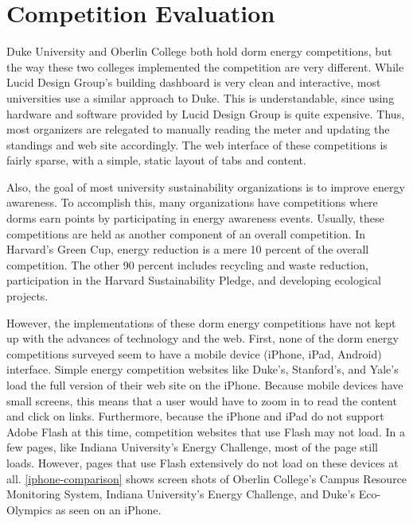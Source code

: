 \section{Competition Evaluation}
\label{competition-evaluation}

Duke University and Oberlin College both hold dorm energy competitions, but the way these two colleges implemented the competition are very different.  While Lucid Design Group's building dashboard is very clean and interactive, most universities use a similar approach to Duke.  This is understandable, since using hardware and software provided by Lucid Design Group is quite expensive.  Thus, most organizers are relegated to manually reading the meter and updating the standings and web site accordingly.  The web interface of these competitions is fairly sparse, with a simple, static layout of tabs and content.

Also, the goal of most university sustainability organizations is to improve energy awareness.  To accomplish this, many organizations have competitions where dorms earn points by participating in energy awareness events.  Usually, these competitions are held as another component of an overall competition. In Harvard's Green Cup\cite{harvard-greencup}, energy reduction is a mere 10 percent of the overall competition. The other 90 percent includes recycling and waste reduction, participation in the Harvard Sustainability Pledge, and developing ecological projects.

However, the implementations of these dorm energy competitions have not kept up with the advances of technology and the web.  First, none of the dorm energy competitions surveyed seem to have a mobile device (iPhone, iPad, Android) interface.  Simple energy competition websites like Duke's, Stanford's, and Yale's load the full version of their web site on the iPhone.  Because mobile devices have small screens, this means that a user would have to zoom in to read the content and click on links.  Furthermore, because the iPhone and iPad do not support Adobe Flash at this time, competition websites that use Flash may not load.  In a few pages, like Indiana University's Energy Challenge, most of the page still loads.  However, pages that use Flash extensively do not load on these devices at all.  \autoref{iphone-comparison} shows screen shots of Oberlin College's Campus Resource Monitoring System, Indiana University's Energy Challenge,  and Duke's Eco-Olympics as seen on an iPhone.

